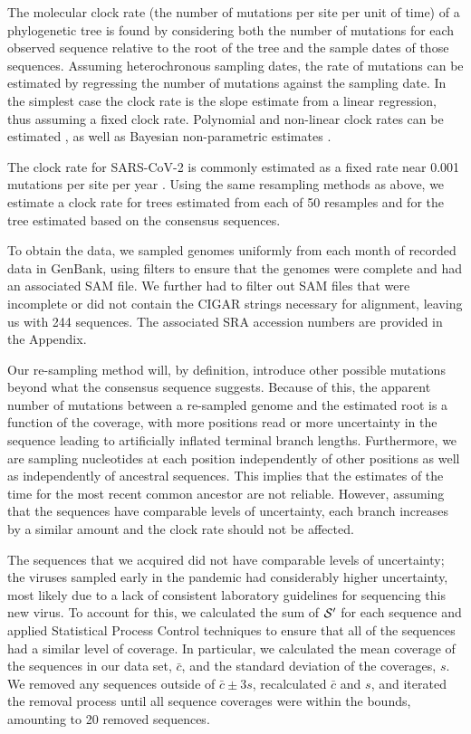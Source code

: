 \documentclass[12pt]{article}
\begin{document}
The molecular clock rate (the number of mutations per site per unit of time) of a phylogenetic tree is found by considering both the number of mutations for each observed sequence relative to the root of the tree and the sample dates of those sequences.
Assuming heterochronous sampling dates, the rate of mutations can be estimated by regressing the number of mutations against the sampling date.
In the simplest case the clock rate is the slope estimate from a linear regression, thus assuming a fixed clock rate.
Polynomial and non-linear clock rates can be estimated \citep{sagulenkoTreeTimeMaximumlikelihoodPhylodynamic2018}, as well as Bayesian non-parametric estimates \citep{drummondBayesianEvolutionaryAnalysis2015}. 

The clock rate for SARS-CoV-2 is commonly estimated as a fixed rate near 0.001 mutations per site per year \citep{ducheneTemporalSignalPhylodynamic2020, choudharySevereAcuteRespiratory2021, songGenomicEpidemiologySARSCoV22021, niePhylogeneticPhylodynamicAnalyses2020, geidelbergGenomicEpidemiologyDensely2021}.
Using the same resampling methods as above, we estimate a clock rate for trees estimated from each of 50 resamples and for the tree estimated based on the consensus sequences.

To obtain the data, we sampled genomes uniformly from each month of recorded data in GenBank, using filters to ensure that the genomes were complete and had an associated SAM file.
We further had to filter out SAM files that were incomplete or did not contain the CIGAR strings necessary for alignment, leaving us with 244 sequences.
The associated SRA accession numbers are provided in the Appendix.

Our re-sampling method will, by definition, introduce other possible mutations beyond what the consensus sequence suggests.
Because of this, the apparent number of mutations between a re-sampled genome and the estimated root is a function of the coverage, with more positions read or more uncertainty in the sequence leading to artificially inflated terminal branch lengths.
Furthermore, we are sampling nucleotides at each position independently of other positions as well as independently of ancestral sequences.
This implies that the estimates of the time for the most recent common ancestor are not reliable.
However, assuming that the sequences have comparable levels of uncertainty, each branch increases by a similar amount and the clock rate should not be affected.

The sequences that we acquired did not have comparable levels of uncertainty; the viruses sampled early in the pandemic had considerably higher uncertainty, most likely due to a lack of consistent laboratory guidelines for sequencing this new virus.
To account for this, we calculated the sum of $\mathcal{S}'$ for each sequence and applied Statistical Process Control techniques to ensure that all of the sequences had a similar level of coverage.
In particular, we calculated the mean coverage of the sequences in our data set, $\bar c$, and the standard deviation of the coverages, $s$.
We removed any sequences outside of $\bar c \pm 3 s$, recalculated $\bar c$ and $s$, and iterated the removal process until all sequence coverages were within the bounds, amounting to 20 removed sequences.
\end{document}
